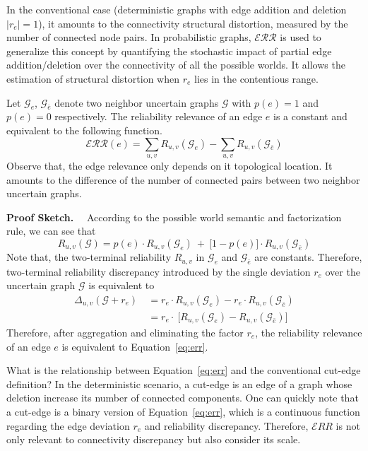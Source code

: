 In the conventional case (deterministic graphs with edge addition and deletion $|r_{e}|=1$), it amounts to the connectivity structural distortion, measured by the number of connected node pairs.  
In probabilistic graphs, $\mathcal{ERR}$ is used to generalize this concept by quantifying the stochastic impact of partial edge addition/deletion over the connectivity of all the possible worlds.
It allows the estimation of structural distortion when $r_{e}$ lies in the contentious range. 

\begin{observation}
  Let $\mathcal{G}_{e}$, $\mathcal{G}_{\bar{e}}$ 
  denote two neighbor uncertain graphs $\mathcal{G}$ with $p(e)=1$ and $p(e)=0$ respectively. 
  The reliability relevance of an edge $e$ is a constant and equivalent to 
  the following function. 
  \begin{equation}
    \mathcal{ERR}(e) = \sum_{u,v} R_{u,v}(\mathcal{G}_{e}) \big- \sum_{u,v} R_{u,v}(\mathcal{G}_{\bar{e}})
    \label{eq:err}
  \end{equation}
  Observe that, the edge relevance only depends on it topological location. 
  It amounts to the difference of the number of connected pairs between two neighbor uncertain graphs. 
\end{observation}

\textbf{Proof Sketch.}~~
According to the possible world semantic and factorization rule, we can see that   
\begin{equation*}
  R_{u,v} (\mathcal{G}) = p(e) \cdot R_{u,v}(\mathcal{G}_{e}) ~+~ \big[ 1-p(e) \big] \cdot R_{u,v} (\mathcal{G}_{\bar{e}})
\end{equation*}
Note that, the two-terminal reliability $R_{u,v}$ in $\mathcal{G}_{e}$ and $\mathcal{G}_{\bar{e}}$ are constants. 
Therefore, two-terminal reliability discrepancy introduced by the single deviation $r_{e}$ over the uncertain graph $\mathcal{G}$ is equivalent to 
\begin{equation*}
  \begin{split}
    \Delta_{u,v} (\mathcal{G}+r_{e}) ~&= r_{e} \cdot R_{u,v}(\mathcal{G}_{e}) - r_{e} \cdot R_{u,v} (\mathcal{G}_{\bar{e}})\\
    &= r_{e} \cdot ~\big[  R_{u,v}(\mathcal{G}_{e}) - R_{u,v} (\mathcal{G}_{\bar{e}})  \big]
  \end{split}
\end{equation*}
Therefore, after aggregation and eliminating the factor $r_{e}$, the reliability relevance of an edge $e$ is equivalent to Equation~\ref{eq:err}. 

What is the relationship between Equation~\ref{eq:err} and the conventional cut-edge definition? 
In the deterministic scenario, a cut-edge is an edge of a graph whose deletion increase its number of connected components. 
One can quickly note that a cut-edge is a binary version of Equation~\ref{eq:err}, 
which is a continuous function regarding the edge deviation $r_{e}$ and reliability discrepancy. 
Therefore, $\mathcal{E}RR$ is not only relevant to connectivity discrepancy but also consider its scale.  

